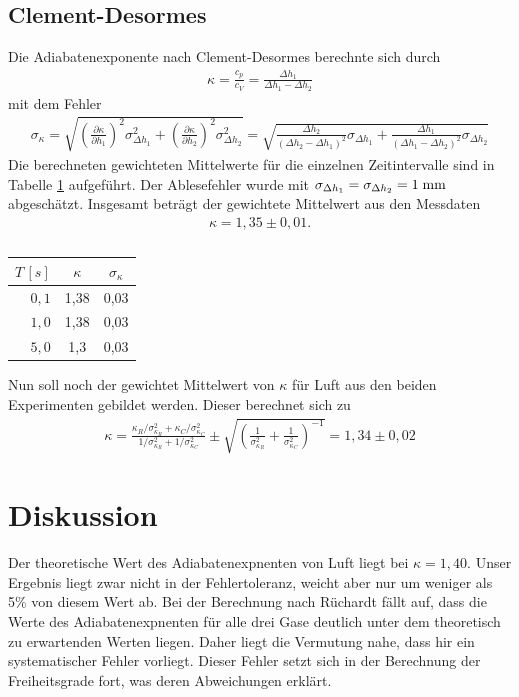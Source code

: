 \documentclass[12pt, a4paper, twoside]{scrartcl}
\begin{document}
\subsection{Clement-Desormes}

Die Adiabatenexponente nach Clement-Desormes berechnte sich durch
\begin{align*}
\kappa=\frac{c_p}{c_V}=\frac{\Delta h_1}{\Delta h_1-\Delta h_2}
\end{align*}
mit dem Fehler
\begin{align*}
\sigma_\kappa=\sqrt{\left(\frac{\partial\kappa}{\partial h_1}\right)^2\sigma_{\Delta h_1}^2+\left(\frac{\partial\kappa}{\partial h_2}\right)^2\sigma_{\Delta h_2}^2}=\sqrt{\frac{\Delta h_2}{(\Delta h_2-\Delta h_1)^2}\sigma_{\Delta h_1}+\frac{\Delta h_1}{(\Delta h_1-\Delta h_2)^2}\sigma_{\Delta h_2}}
\end{align*}
Die berechneten gewichteten Mittelwerte für die einzelnen Zeitintervalle sind in Tabelle \ref{tab:clement} aufgeführt. Der Ablesefehler wurde mit $\sigma_{\Delta h_1}=\sigma_{\Delta h_2}=1\milli\meter$ abgeschätzt. Insgesamt beträgt der gewichtete Mittelwert aus den Messdaten
\begin{align*}
\kappa=1,35\pm0,01.
\end{align*}

\begin{table} [H]
\centering
\begin{tabular}{|r|c|c|} \hline
    $T\,[s]$ & $\kappa$ & $\sigma_\kappa$ \\ \hline
    $0,1$ & 1,38& 0,03 \\
    $1,0$ & 1,38& 0,03\\
    $5,0$ & 1,3& 0,03\\ \hline
 \end{tabular} 
 \caption{\label{tab:clement}}
\end{table}
Nun soll noch der gewichtet Mittelwert von $\kappa$ für Luft aus den beiden Experimenten gebildet werden. Dieser berechnet sich zu
\begin{align*}
\kappa=\frac{\kappa_R/\sigma_{\kappa_R}^2+\kappa_C/\sigma_{\kappa_C}^2}{1/\sigma_{\kappa_R}^2+1/\sigma_{\kappa_C}^2}\pm\sqrt{\left(\frac{1}{\sigma_{\kappa_R}^2}+\frac{1}{\sigma_{\kappa_C}^2}\right)^{-1}}=1,34\pm0,02
\end{align*}


\section{Diskussion}
\label{sec:diskussion}
Der theoretische Wert des Adiabatenexpnenten von Luft liegt bei $\kappa=1,40$. Unser Ergebnis liegt zwar nicht in der Fehlertoleranz, weicht aber nur um weniger als 5\% von diesem Wert ab. Bei der Berechnung nach Rüchardt fällt auf, dass die Werte des Adiabatenexpnenten für alle drei Gase deutlich unter dem theoretisch zu erwartenden Werten liegen. Daher liegt die Vermutung nahe, dass hir ein systematischer Fehler vorliegt. Dieser Fehler setzt sich in der Berechnung der Freiheitsgrade fort, was deren Abweichungen erklärt. 
\end{document}
